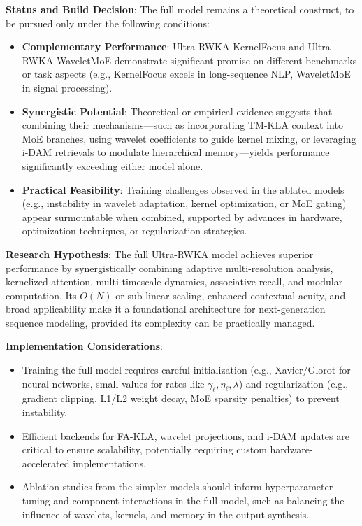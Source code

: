 \documentclass{article}
\begin{document}
\textbf{Status and Build Decision}: The full model remains a theoretical construct, to be pursued only under the following conditions:
\begin{itemize}
    \item \textbf{Complementary Performance}: Ultra-RWKA-KernelFocus and Ultra-RWKA-WaveletMoE demonstrate significant promise on different benchmarks or task aspects (e.g., KernelFocus excels in long-sequence NLP, WaveletMoE in signal processing).
    \item \textbf{Synergistic Potential}: Theoretical or empirical evidence suggests that combining their mechanisms—such as incorporating TM-KLA context into MoE branches, using wavelet coefficients to guide kernel mixing, or leveraging i-DAM retrievals to modulate hierarchical memory—yields performance significantly exceeding either model alone.
    \item \textbf{Practical Feasibility}: Training challenges observed in the ablated models (e.g., instability in wavelet adaptation, kernel optimization, or MoE gating) appear surmountable when combined, supported by advances in hardware, optimization techniques, or regularization strategies.
\end{itemize}

\textbf{Research Hypothesis}: The full Ultra-RWKA model achieves superior performance by synergistically combining adaptive multi-resolution analysis, kernelized attention, multi-timescale dynamics, associative recall, and modular computation. Its $O(N)$ or sub-linear scaling, enhanced contextual acuity, and broad applicability make it a foundational architecture for next-generation sequence modeling, provided its complexity can be practically managed.

\textbf{Implementation Considerations}:
\begin{itemize}
    \item Training the full model requires careful initialization (e.g., Xavier/Glorot for neural networks, small values for rates like $\gamma_\ell, \eta_\ell, \lambda$) and regularization (e.g., gradient clipping, L1/L2 weight decay, MoE sparsity penalties) to prevent instability.
    \item Efficient backends for FA-KLA, wavelet projections, and i-DAM updates are critical to ensure scalability, potentially requiring custom hardware-accelerated implementations.
    \item Ablation studies from the simpler models should inform hyperparameter tuning and component interactions in the full model, such as balancing the influence of wavelets, kernels, and memory in the output synthesis.
\end{itemize}
\end{document}
